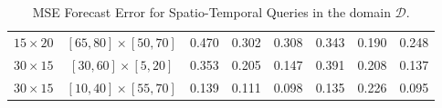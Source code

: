\begin{table}[h]
\begin{tabular}{|c|c|r|r|r|r|r|r|}
		$15 \times 20$ & $[65, 80] \times [50, 70]$ & 0.470 & 0.302 & 0.308 & \cellcolor{red!20}0.343 & 0.190 & 0.248 \\ %
		$30 \times 15$ & $[30, 60] \times [ 5, 20]$ & 0.353 & 0.205 & 0.147 & \cellcolor{red!20}0.391 & 0.208 & 0.137 \\ %
		$30 \times 15$ & $[10, 40] \times [55, 70]$ & 0.139 & 0.111 & 0.098 & \cellcolor{red!20}0.135 & 0.226 & 0.095 \\ %
		\hline
	\end{tabular}
	\caption{MSE Forecast Error for Spatio-Temporal Queries in the domain $\mathcal{D}$.}
	\label{Table:MSEForecasError}
\end{table}



